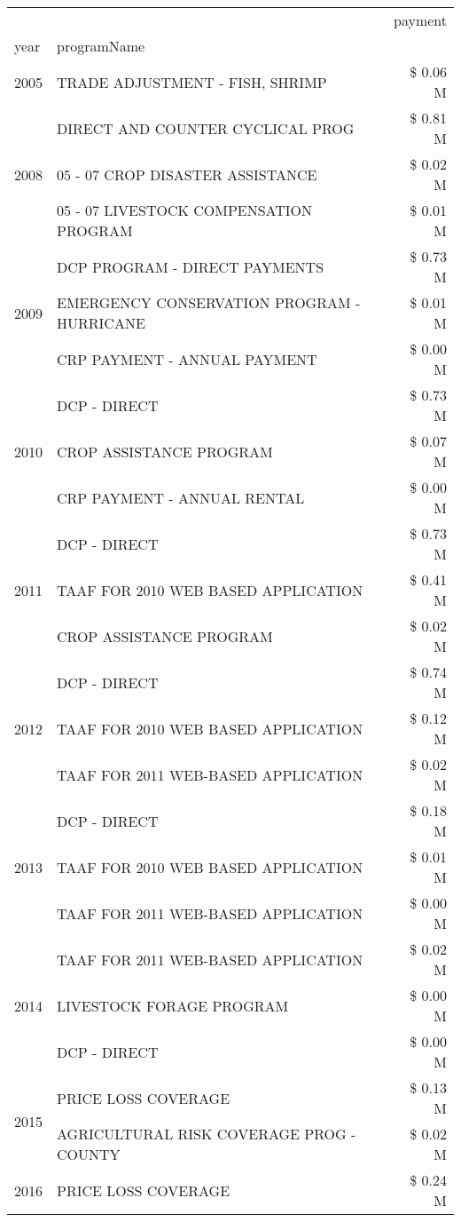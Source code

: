 \begin{tabular}{llr}
\toprule
 &  & payment \\
year & programName &  \\
\midrule
2005 & TRADE ADJUSTMENT - FISH, SHRIMP & \$ 0.06 M \\
\cline{1-3}
\multirow[t]{3}{*}{2008} & DIRECT AND COUNTER CYCLICAL PROG & \$ 0.81 M \\
 & 05 - 07 CROP DISASTER ASSISTANCE & \$ 0.02 M \\
 & 05 - 07 LIVESTOCK COMPENSATION PROGRAM & \$ 0.01 M \\
\cline{1-3}
\multirow[t]{3}{*}{2009} & DCP PROGRAM - DIRECT PAYMENTS & \$ 0.73 M \\
 & EMERGENCY CONSERVATION PROGRAM - HURRICANE & \$ 0.01 M \\
 & CRP PAYMENT - ANNUAL PAYMENT & \$ 0.00 M \\
\cline{1-3}
\multirow[t]{3}{*}{2010} & DCP - DIRECT & \$ 0.73 M \\
 & CROP ASSISTANCE PROGRAM & \$ 0.07 M \\
 & CRP PAYMENT - ANNUAL RENTAL & \$ 0.00 M \\
\cline{1-3}
\multirow[t]{3}{*}{2011} & DCP - DIRECT & \$ 0.73 M \\
 & TAAF FOR 2010 WEB BASED APPLICATION & \$ 0.41 M \\
 & CROP ASSISTANCE PROGRAM & \$ 0.02 M \\
\cline{1-3}
\multirow[t]{3}{*}{2012} & DCP - DIRECT & \$ 0.74 M \\
 & TAAF FOR 2010 WEB BASED APPLICATION & \$ 0.12 M \\
 & TAAF FOR 2011 WEB-BASED APPLICATION & \$ 0.02 M \\
\cline{1-3}
\multirow[t]{3}{*}{2013} & DCP - DIRECT & \$ 0.18 M \\
 & TAAF FOR 2010 WEB BASED APPLICATION & \$ 0.01 M \\
 & TAAF FOR 2011 WEB-BASED APPLICATION & \$ 0.00 M \\
\cline{1-3}
\multirow[t]{3}{*}{2014} & TAAF FOR 2011 WEB-BASED APPLICATION & \$ 0.02 M \\
 & LIVESTOCK FORAGE PROGRAM & \$ 0.00 M \\
 & DCP - DIRECT & \$ 0.00 M \\
\cline{1-3}
\multirow[t]{2}{*}{2015} & PRICE LOSS COVERAGE & \$ 0.13 M \\
 & AGRICULTURAL RISK COVERAGE PROG - COUNTY & \$ 0.02 M \\
\cline{1-3}
\multirow[t]{3}{*}{2016} & PRICE LOSS COVERAGE & \$ 0.24 M \\

\end{tabular}
